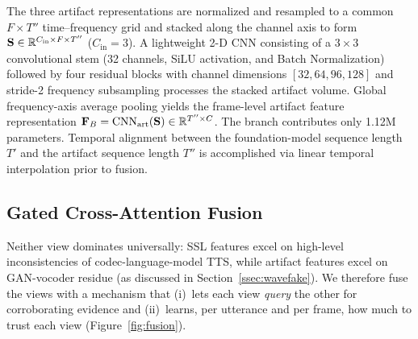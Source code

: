 The three artifact representations are normalized and resampled to a common $F \times T''$ time--frequency grid and stacked along the channel axis to form $\mathbf{S} \in \mathbb{R}^{C_{\text{in}} \times F \times T''}$ ($C_{\text{in}} = 3$). A lightweight 2-D CNN consisting of a $3{\times}3$ convolutional stem (32 channels, SiLU activation, and Batch Normalization) followed by four residual blocks with channel dimensions $[32, 64, 96, 128]$ and stride-2 frequency subsampling processes the stacked artifact volume. Global frequency-axis average pooling yields the frame-level artifact feature representation $\mathbf{F}_B = \operatorname{CNN}_{\text{art}}(\mathbf{S}) \in \mathbb{R}^{T'' \times C}$. The branch contributes only 1.12M parameters. Temporal alignment between the foundation-model sequence length $T'$ and the artifact sequence length $T''$ is accomplished via linear temporal interpolation prior to fusion.

\subsection{Gated Cross-Attention Fusion}
\label{ssec:fusion}

Neither view dominates universally: SSL features excel on high-level inconsistencies of
codec-language-model TTS, while artifact features excel on GAN-vocoder residue
(as discussed in Section~\ref{ssec:wavefake}). We therefore fuse the views with a mechanism that
(i)~lets each view \emph{query} the other for corroborating evidence and (ii)~learns,
per utterance and per frame, how much to trust each view (Figure~\ref{fig:fusion}).

